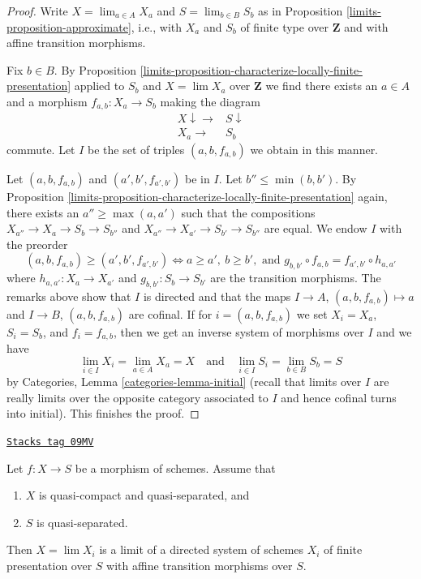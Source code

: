 \begin{proof}

Write $X = \lim_{a \in A} X_a$ and $S = \lim_{b \in B} S_b$ as in
Proposition \ref{limits-proposition-approximate}, i.e., with $X_a$ and $S_b$
of finite type over $\mathbf{Z}$ and with affine transition morphisms.

\medskip\noindent
Fix $b \in B$.
By Proposition \ref{limits-proposition-characterize-locally-finite-presentation}
applied to $S_b$ and $X = \lim X_a$ over $\mathbf{Z}$
we find there exists an $a \in A$ and a morphism
$f_{a, b} : X_a \to S_b$ making the diagram
$$
\begin{array}{cc}X \downarrow\longrightarrow & S \downarrow \\ X_a \longrightarrow & S_b\end{array}
$$
commute. Let $I$ be the set of triples $(a, b, f_{a, b})$ we
obtain in this manner.

\medskip\noindent
Let $(a, b, f_{a, b})$ and $(a', b', f_{a', b'})$ be in $I$.
Let $b'' \leq \min(b, b')$. By
Proposition \ref{limits-proposition-characterize-locally-finite-presentation}
again, there exists an $a'' \geq \max(a, a')$ such that
the compositions $X_{a''} \to X_a \to S_b \to S_{b''}$ and
$X_{a''} \to X_{a'} \to S_{b'} \to S_{b''}$ are equal.
We endow $I$ with the preorder
$$
(a, b, f_{a, b}) \geq (a', b', f_{a', b'})
\Leftrightarrow
a \geq a',\ b \geq b',\text{ and }
g_{b, b'} \circ f_{a, b} = f_{a', b'} \circ h_{a, a'}
$$
where $h_{a, a'} : X_a \to X_{a'}$ and $g_{b, b'} : S_b \to S_{b'}$
are the transition morphisms. The remarks above show that $I$
is directed and that the maps $I \to A$, $(a, b, f_{a, b}) \mapsto a$
and $I \to B$, $(a, b, f_{a, b})$ are cofinal. If for $i = (a, b, f_{a, b})$
we set $X_i = X_a$, $S_i = S_b$, and $f_i = f_{a, b}$, then we get
an inverse system of morphisms over $I$ and we have
$$
\lim_{i \in I} X_i = \lim_{a \in A} X_a = X
\quad\text{and}\quad
\lim_{i \in I} S_i = \lim_{b \in B} S_b = S
$$
by Categories, Lemma \ref{categories-lemma-initial} (recall that
limits over $I$ are really limits over the opposite category
associated to $I$ and hence cofinal turns into initial).
This finishes the proof.
\end{proof}

\begin{lemma}
\label{limits-lemma-relative-approximation}
\href{https://stacks.math.columbia.edu/tag/09MV}{\texttt{Stacks tag 09MV}}

Let $f : X \to S$ be a morphism of schemes. Assume that
\begin{enumerate}
\item $X$ is quasi-compact and quasi-separated, and
\item $S$ is quasi-separated.
\end{enumerate}
Then $X = \lim X_i$ is a limit of a directed system of schemes
$X_i$ of finite presentation over $S$ with affine transition morphisms
over $S$.
\end{lemma}

